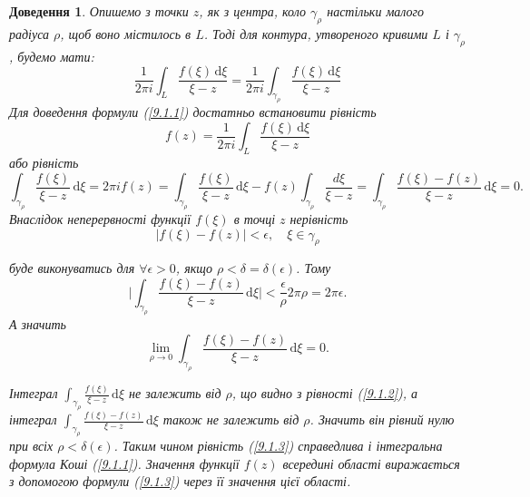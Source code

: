 \documentclass[12pt,fleqn]{article}
\theoremstyle{theorem}
\theoremstyle{proof}
\newtheorem*{dov}{Доведення}
\numberwithin{figure}{section}
\numberwithin{equation}{section}
\begin{document}
\begin{dov}\label{dov.9.1.1}
Опишемо з точки $z$, як з центра, коло $\gamma_\rho$ настільки малого радіуса $\rho$, щоб воно містилось в $L$. Тоді для контура, утвореного кривими $L$ і $\gamma_\rho$, будемо мати:
\begin{equation}\label{9.1.2}
\frac{1}{2\pi i}\int_{L}\frac{f(\xi)\,\mathrm{d}\xi}{\xi-z} = \frac{1}{2\pi i}\int_{\gamma_\rho} \frac{f(\xi)\,\mathrm{d}\xi}{\xi-z}
\end{equation}
Для доведення формули (\ref{9.1.1}) достатньо встановити рівність
\[ f(z)= \frac{1}{2\pi i} \int_{L}\frac{f(\xi)\,\mathrm{d}\xi}{\xi-z} \]
або рівність
\begin{equation}\label{9.1.3}
\int_{\gamma_\rho}\frac{f(\xi)}{\xi-z}\,\mathrm{d}\xi=2\pi if(z) = \int_{\gamma_\rho}\frac{f(\xi)}{\xi-z}\,\mathrm{d}\xi-f(z)\int_{\gamma_\rho}\frac{d\xi}{\xi-z}=\int_{\gamma_\rho}\frac{f(\xi)-f(z)}{\xi-z}\,\mathrm{d}\xi=0.
\end{equation}
Внаслідок неперервності функції $f(\xi)$ в точці $z$ нерівність
\[ |f(\xi)-f(z)|<\epsilon, \quad \xi\in\gamma_\rho \]

буде виконуватись для $\forall\epsilon>0$, якщо $\rho<\delta=\delta(\epsilon)$. Тому
\[ \bigg| \int_{\gamma_\rho} \frac{f(\xi)-f(z)}{\xi-z}\,\mathrm{d}\xi \bigg|< \frac{\epsilon}{\rho} 2\pi\rho=2\pi\epsilon. \]
А значить
\[ \lim_{\rho \to 0} \int_{\gamma_\rho} \frac{f(\xi)-f(z)}{\xi-z}\,\mathrm{d}\xi=0. \]

Інтеграл $\int_{\gamma_\rho} \frac{f(\xi)}{\xi - z}\,\mathrm{d}\xi$ не залежить від $\rho$, що видно з рівності (\ref{9.1.2}), а інтеграл $\int_{\gamma_\rho} \frac{f(\xi)-f(z)}{\xi - z}\,\mathrm{d}\xi$ також не залежить від $\rho$. Значить він рівний нулю при всіх $\rho < \delta(\epsilon)$. Таким чином рівність (\ref{9.1.3}) справедлива і інтегральна формула Коші (\ref{9.1.1}).
Значення функції $f(z)$ всередині області виражається з допомогою формули (\ref{9.1.3}) через її значення цієї області.


\end{dov}
\end{document}
